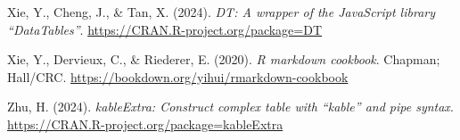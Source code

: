 \documentclass[
  letterpaper,
  DIV=11,
  numbers=noendperiod]{scrartcl}
\newlength{\cslhangindent}
\newenvironment{CSLReferences}[2] %
 {\begin{list}{}{%
  \setlength{\itemindent}{0pt}
  \setlength{\leftmargin}{0pt}
  \setlength{\parsep}{0pt}
  \ifodd #1
   \setlength{\leftmargin}{\cslhangindent}
   \setlength{\itemindent}{-1\cslhangindent}
  \fi
  \setlength{\itemsep}{#2\baselineskip}}}
 {\end{list}}
\begin{document}
\begin{CSLReferences}{1}{0}
Xie, Y., Cheng, J., \& Tan, X. (2024). \emph{{DT}: A wrapper of the
JavaScript library {``{DataTables}''}}.
\url{https://CRAN.R-project.org/package=DT}

Xie, Y., Dervieux, C., \& Riederer, E. (2020). \emph{R markdown
cookbook}. Chapman; Hall/CRC.
\url{https://bookdown.org/yihui/rmarkdown-cookbook}

Zhu, H. (2024). \emph{{kableExtra}: Construct complex table with
{``{kable}''} and pipe syntax}.
\url{https://CRAN.R-project.org/package=kableExtra}

\end{CSLReferences}
\end{document}
